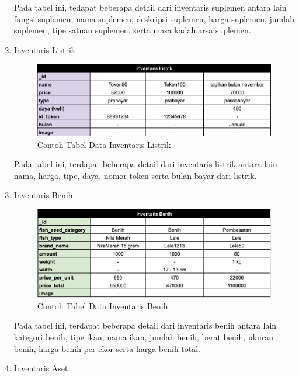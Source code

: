 \begin{spacing}{1.5}
\begin{enumerate}
	Pada tabel ini, tedapat beberapa detail dari inventaris suplemen antara lain fungsi suplemen, nama suplemen, deskripsi suplemen, harga suplemen, jumlah suplemen, tipe satuan suplemen, serta masa kadaluarsa suplemen.

	\item Inventaris Listrik
	
	\begin{figure}[H]
		\centering
		\includegraphics[width=1\textwidth]{gambar/tabel_inventaris_listrik.png}
		\caption{Contoh Tabel Data Inventaris Listrik}
	\end{figure}	

	Pada tabel ini, terdapat beberapa detail dari inventaris listrik antara lain nama, harga, tipe, daya, nomor token serta bulan bayar dari listrik.

	\hfill \break
	\hfill \break
	\hfill \break
	\hfill \break

	\item Inventaris Benih
	
	\begin{figure}[H]
		\centering
		\includegraphics[width=1\textwidth]{gambar/tabel_inventaris_benih.png}
		\caption{Contoh Tabel Data Inventaris Benih}
	\end{figure}	

	Pada tabel ini, terdapat beberapa detail dari inventaris benih antara lain kategori benih, tipe ikan, nama ikan, jumlah benih, berat benih, ukuran benih, harga benih per ekor serta harga benih total.

	\item Inventaris Aset
	

\end{enumerate}
\end{spacing}
